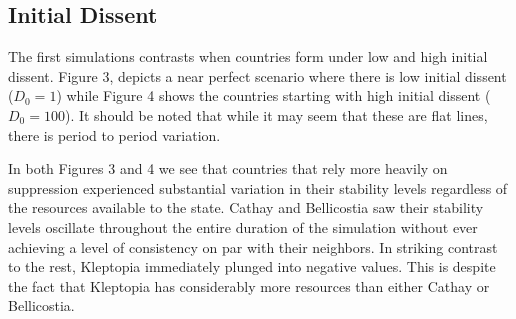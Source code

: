 \documentclass[12pt]{article}
\begin{document}
\begin{spacing}{1.5}
\subsection{Initial Dissent}



The first simulations contrasts when countries form under low and high initial dissent. Figure 3, depicts a near perfect scenario where there is low initial dissent ($D_0 = 1$) while Figure 4 shows the countries starting with high initial dissent ($D_0 = 100$). It should be noted that while it may seem that these are flat lines, there is period to period variation.  

In both Figures 3 and 4 we see that countries that rely more heavily on suppression experienced substantial variation in their stability levels regardless of the resources available to the state. Cathay and Bellicostia saw their stability levels oscillate throughout the entire duration of the simulation without ever achieving a level of consistency on par with their neighbors. In striking contrast to the rest, Kleptopia immediately plunged into negative values. This is despite the fact that Kleptopia has considerably more resources than either Cathay or Bellicostia. 


\end{spacing}
\end{document}

